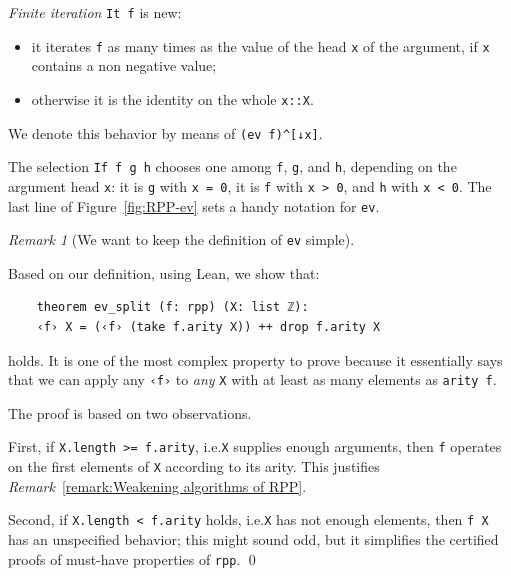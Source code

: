 \documentclass[preprint]{elsarticle}
\theoremstyle{remark}
\newtheorem{remark}{Remark}
\newcommand{\LEAN}{\textsf{Lean}\xspace}
\begin{document}
\vspace{\baselineskip}
\noindent
\emph{Finite iteration} \lstinline|It f| is new:
\begin{itemize}
    \item it iterates \lstinline|f| as many times as the value of the head \lstinline|x| of the argument, if \lstinline|x| contains a non negative value;
    \item otherwise it is the identity on the whole \lstinline|x::X|.
\end{itemize}
We denote this behavior by means of \lstinline|(ev f)^[↓x]|.

\vspace{\baselineskip}
\noindent
The selection \lstinline|If f g h| chooses one among \lstinline|f|, \lstinline|g|, and \lstinline|h|, depending on the argument head \lstinline|x|: it is \lstinline|g| with \lstinline|x = 0|, it is \lstinline|f| with \lstinline|x > 0|, and \lstinline|h| with \lstinline|x < 0|.
The last line of Figure~\ref{fig:RPP-ev} sets a handy notation for \lstinline|ev|.

\begin{remark}[We want to keep the definition of \texttt{ev} simple]
\label{remark:We keep the definition of ev simple}

Based on our definition, using \LEAN, we show that:
\begin{lstlisting}
    theorem ev_split (f: rpp) (X: list ℤ):
    ‹f› X = (‹f› (take f.arity X)) ++ drop f.arity X
\end{lstlisting}
holds. It is one of the most complex property to prove because it essentially says that we can apply any \lstinline|‹f›| to \emph{any} \lstinline|X| with at least as many elements as \lstinline|arity f|.

The proof is based on two observations.

First, if \lstinline|X.length >= f.arity|, i.e.\@ \lstinline|X| supplies enough arguments, then \lstinline|f| operates on the first elements of \lstinline|X| according to its arity. This justifies \textit{Remark}~\ref{remark:Weakening algorithms of RPP}.

Second, if \lstinline|X.length < f.arity| holds, i.e.\@ \lstinline|X| has not enough elements, then \lstinline|f X| has an unspecified behavior; this might sound odd, but it simplifies the certified proofs of must-have properties of \lstinline|rpp|.
\qed
\end{remark}

\end{document}
